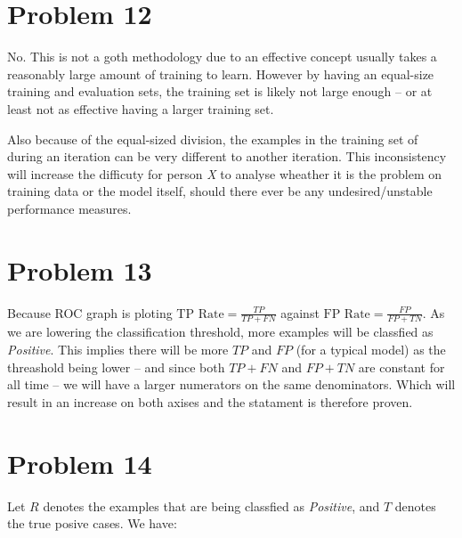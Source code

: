 \documentclass[12pt]{article}
\begin{document}
\section{Problem 12}

No. This is not a goth methodology due to an effective concept usually takes a reasonably large amount of training to learn. However by having an equal-size training and evaluation sets, the training set is likely not large enough -- or at least not as effective having a larger training set.

Also because of the equal-sized division, the examples in the training set of during an iteration can be very different to another iteration. This inconsistency will increase the difficuty for person \textit{X} to analyse wheather it is the problem on training data or the model itself, should there ever be any undesired/unstable performance measures.

\section{Problem 13}

Because ROC graph is ploting $\text{TP Rate} = \frac{TP}{TP + FN}$ against $\text{FP Rate} = \frac{FP}{FP + TN}$. As we are lowering the classification threshold, more examples will be classfied as \textit{Positive}. This implies there will be more $TP$ and $FP$ (for a typical model) as the threashold being lower -- and since both $TP + FN$ and $FP + TN$ are constant for all time -- we will have a larger numerators on the same denominators. Which will result in an increase on both axises and the statament is therefore proven.

\section{Problem 14}

Let $R$ denotes the examples that are being classfied as \textit{Positive}, and $T$ denotes the true posive cases. We have:
\end{document}

